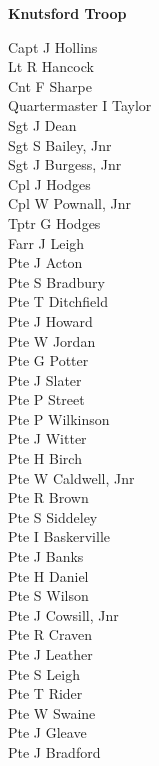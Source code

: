 \vspace*{10mm}

\begin{center}
  \Large
  \textbf{Knutsford Troop}
\end{center}

\vspace*{10mm}

\begin{multicols}{3}
  \small
  \noindent
  Capt J Hollins \\
  Lt R Hancock \\
  Cnt F Sharpe \\
  Quartermaster I Taylor \\
  Sgt J Dean \\
  Sgt S Bailey, Jnr \\
  Sgt J Burgess, Jnr \\
  Cpl J Hodges \\
  Cpl W Pownall, Jnr \\
  Tptr G Hodges \\
  Farr J Leigh \\
  Pte J Acton \\
  Pte S Bradbury \\
  Pte T Ditchfield \\
  Pte J Howard \\
  Pte W Jordan \\
  Pte G Potter \\
  Pte J Slater \\
  Pte P Street \\
  Pte P Wilkinson \\
  Pte J Witter \\
  Pte H Birch \\
  Pte W Caldwell, Jnr \\
  Pte R Brown \\
  Pte S Siddeley \\
  Pte I Baskerville \\
  Pte J Banks \\
  Pte H Daniel \\
  Pte S Wilson \\
  Pte J Cowsill, Jnr \\
  Pte R Craven \\
  Pte J Leather \\
  Pte S Leigh \\
  Pte T Rider \\
  Pte W Swaine \\
  Pte J Gleave \\
  Pte J Bradford \\

\end{multicols}
